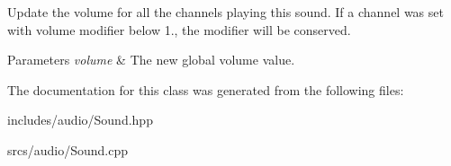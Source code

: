 Update the volume for all the channels playing this sound. If a channel was set with volume modifier below 1., the modifier will be conserved. 


\begin{DoxyParams}{Parameters}
{\em volume} & The new global volume value. \\
\hline
\end{DoxyParams}


The documentation for this class was generated from the following files\+:\begin{DoxyCompactItemize}
\item 
includes/audio/Sound.\+hpp\item 
srcs/audio/Sound.\+cpp\end{DoxyCompactItemize}
